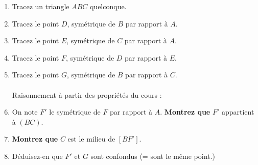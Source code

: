 \documentclass[14 pt]{extarticle}
\theoremstyle{plain}
\begin{document}
\begin{enumerate}
\item Tracez un triangle $ABC$ quelconque. 
\item Tracez le point $D$, symétrique de $B$ par rapport à $A$. 
\item Tracez le point $E$, symétrique de $C$ par rapport à $A$. 
\item Tracez le point $F$, symétrique de $D$ par rapport à $E$. 
\item Tracez le point $G$, symétrique de $B$ par rapport à $C$. \\ \\Raisonnement à partir des propriétés du cours : 
\item On note $F'$ le symétrique de $F$ par rapport à $A$. \textbf{Montrez que} $F'$ appartient à $(BC)$.
\item \textbf{Montrez que} $C$ est le milieu de $[BF']$. 
\item Déduisez-en que $F'$ et $G$ sont confondus (= sont le même point.)

\end{enumerate}



 	
\end{document}
